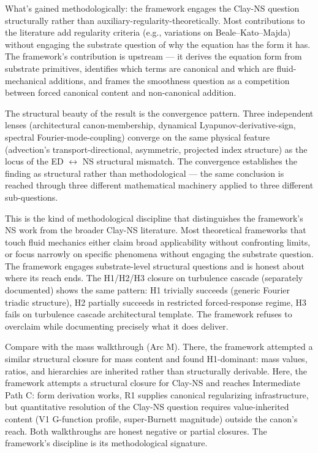 \documentclass[11pt,a4paper]{article}
\begin{document}
What's gained methodologically: the framework engages the Clay-NS question structurally rather than auxiliary-regularity-theoretically. Most contributions to the literature add regularity criteria (e.g., variations on Beale--Kato--Majda) without engaging the substrate question of why the equation has the form it has. The framework's contribution is upstream --- it derives the equation form from substrate primitives, identifies which terms are canonical and which are fluid-mechanical additions, and frames the smoothness question as a competition between forced canonical content and non-canonical addition.

The structural beauty of the result is the convergence pattern. Three independent lenses (architectural canon-membership, dynamical Lyapunov-derivative-sign, spectral Fourier-mode-coupling) converge on the same physical feature (advection's transport-directional, asymmetric, projected index structure) as the locus of the ED $\leftrightarrow$ NS structural mismatch. The convergence establishes the finding as structural rather than methodological --- the same conclusion is reached through three different mathematical machinery applied to three different sub-questions.

This is the kind of methodological discipline that distinguishes the framework's NS work from the broader Clay-NS literature. Most theoretical frameworks that touch fluid mechanics either claim broad applicability without confronting limits, or focus narrowly on specific phenomena without engaging the substrate question. The framework engages substrate-level structural questions and is honest about where its reach ends. The H1/H2/H3 closure on turbulence cascade (separately documented) shows the same pattern: H1 trivially succeeds (generic Fourier triadic structure), H2 partially succeeds in restricted forced-response regime, H3 fails on turbulence cascade architectural template. The framework refuses to overclaim while documenting precisely what it does deliver.

Compare with the mass walkthrough (Arc M). There, the framework attempted a similar structural closure for mass content and found H1-dominant: mass values, ratios, and hierarchies are inherited rather than structurally derivable. Here, the framework attempts a structural closure for Clay-NS and reaches Intermediate Path C: form derivation works, R1 supplies canonical regularizing infrastructure, but quantitative resolution of the Clay-NS question requires value-inherited content (V1 G-function profile, super-Burnett magnitude) outside the canon's reach. Both walkthroughs are honest negative or partial closures. The framework's discipline is its methodological signature.
\end{document}
